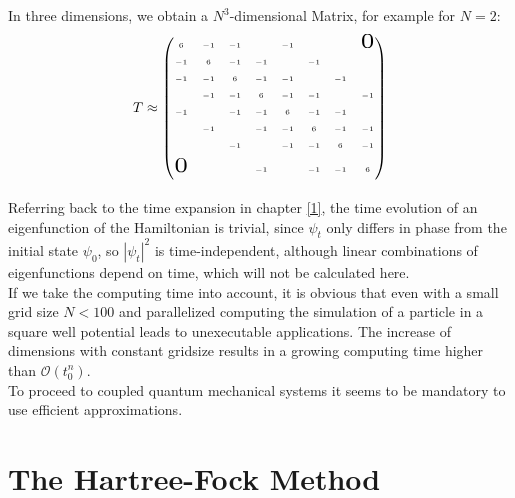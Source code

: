 \documentclass[twoside,        %
			   12pt,			%
               BCOR10mm,       %
               ngerman,english  %
               ]{scrartcl}
\begin{document}
In three dimensions, we obtain a $N^3$-dimensional Matrix, for example for $N=2$:
\begin{align*}
T \approx
\tiny
\begin{pmatrix}
 6 & -1 & -1 &  & -1 &  &  & \scalebox{3}{$0$}  \\\\
   -1 & 6 & -1 & -1 &  & -1 &  & \\\\
     -1 & -1 & 6 & -1 & -1 &  & -1 & \\\\
        & -1 & -1 & 6 & -1 & -1 &  & -1\\\\
        -1 &  & -1 & -1 & 6 & -1 & -1 & \\\\
           & -1 &  & -1 & -1 & 6 & -1 & -1\\\\
             &  & -1 &  & -1 & -1 & 6 & -1\\\\
              \scalebox{3}{$0$}  &  &  & -1 &  & -1 & -1 & 6\\\\
              \end{pmatrix}
\end{align*}

Referring back to the time expansion in chapter \ref{1}, the time evolution of an eigenfunction of the Hamiltonian is trivial, since $\psi_t$ only differs in phase from the initial state $\psi_0$, so ${|\psi_t|}^2$ is time-independent, although linear combinations of eigenfunctions depend on time, which will not be calculated here.\\

If we take the computing time into account, it is obvious that even with a small grid size $N<100$ and parallelized computing the simulation of a particle in a square well potential leads to unexecutable applications. The increase of dimensions with constant gridsize results in a growing computing time higher than $\mathcal O (t_0^n)$. \\

To proceed to coupled quantum mechanical systems it seems to be mandatory to use efficient approximations.




\section{The Hartree-Fock Method}\label{CH:HF}
    
\end{document}
